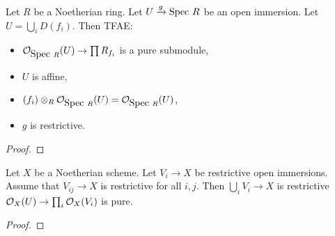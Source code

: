 


\begin{proposition}
Let $R$ be a Noetherian ring. Let $U\xrightarrow{g} \mbox{Spec }{R}$ be an open immersion.
Let $U=\bigcup_i D(f_i)$.
Then TFAE:
\begin{itemize}
\item $\mathcal{O}_{\mbox{Spec }{R}}(U) \rightarrow \prod R_{f_i}$ is a pure submodule,
\item $U$ is affine,
\item $(f_i)\otimes_R \mathcal{O}_{\mbox{Spec }{R}}(U) = \mathcal{O}_{\mbox{Spec }{R}}(U)$,
\item $g$ is restrictive.
\end{itemize}
\end{proposition}
\begin{proof}

\end{proof}

\begin{lemma}
Let $X$ be a Noetherian scheme. Let $V_i\rightarrow X$ be restrictive open immersions.
Assume that $V_{ij} \rightarrow X$ is restrictive for all $i,j$. 
Then $\bigcup_i V_i \rightarrow X$ is restrictive \iff $\mathcal{O}_{X}(U)\rightarrow \prod_i \mathcal{O}_{X}(V_i)$ is pure.
\end{lemma}
\begin{proof}

\end{proof}
